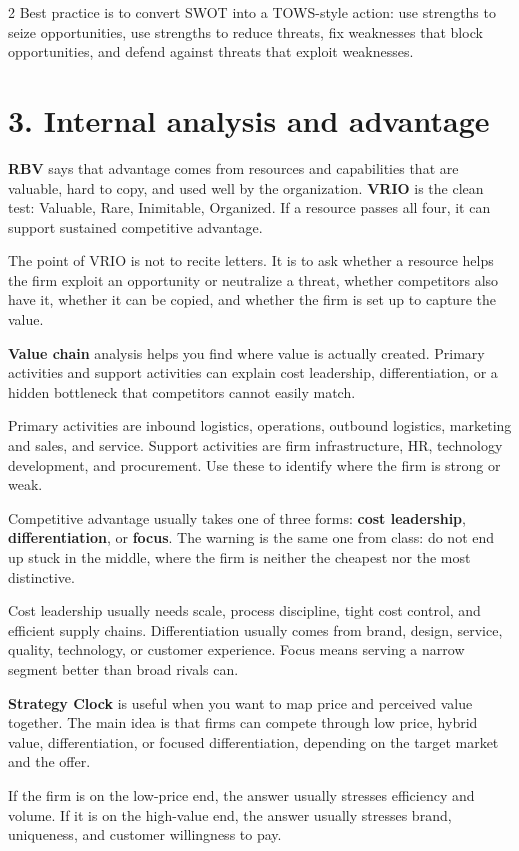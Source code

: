 \documentclass[8pt,letterpaper]{article}
\newcommand{\term}[1]{\textbf{#1}}
\begin{document}
\begin{multicols}{2}
Best practice is to convert SWOT into a TOWS-style action: use strengths to seize opportunities, use strengths to reduce threats, fix weaknesses that block opportunities, and defend against threats that exploit weaknesses.

\section*{3. Internal analysis and advantage}
\term{RBV} says that advantage comes from resources and capabilities that are valuable, hard to copy, and used well by the organization. \term{VRIO} is the clean test: Valuable, Rare, Inimitable, Organized. If a resource passes all four, it can support sustained competitive advantage.

The point of VRIO is not to recite letters. It is to ask whether a resource helps the firm exploit an opportunity or neutralize a threat, whether competitors also have it, whether it can be copied, and whether the firm is set up to capture the value.

\term{Value chain} analysis helps you find where value is actually created. Primary activities and support activities can explain cost leadership, differentiation, or a hidden bottleneck that competitors cannot easily match.

Primary activities are inbound logistics, operations, outbound logistics, marketing and sales, and service. Support activities are firm infrastructure, HR, technology development, and procurement. Use these to identify where the firm is strong or weak.

Competitive advantage usually takes one of three forms: \term{cost leadership}, \term{differentiation}, or \term{focus}. The warning is the same one from class: do not end up stuck in the middle, where the firm is neither the cheapest nor the most distinctive.

Cost leadership usually needs scale, process discipline, tight cost control, and efficient supply chains. Differentiation usually comes from brand, design, service, quality, technology, or customer experience. Focus means serving a narrow segment better than broad rivals can.

\term{Strategy Clock} is useful when you want to map price and perceived value together. The main idea is that firms can compete through low price, hybrid value, differentiation, or focused differentiation, depending on the target market and the offer.

If the firm is on the low-price end, the answer usually stresses efficiency and volume. If it is on the high-value end, the answer usually stresses brand, uniqueness, and customer willingness to pay.


\end{multicols}
\end{document}
